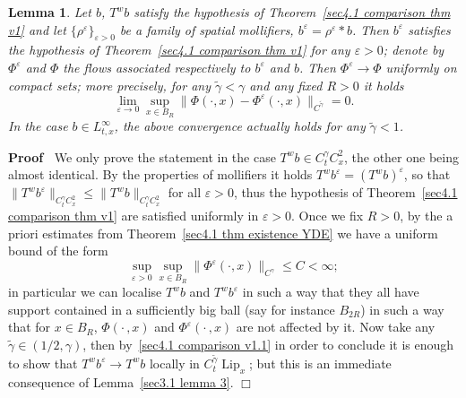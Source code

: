 \documentclass[10pt]{article}
\newcommand{\tmop}[1]{\ensuremath{\operatorname{#1}}}
\newenvironment{proof}{\noindent\textbf{Proof\ }}{\hspace*{\fill}$\Box$\medskip}
\newtheorem{lemma}{Lemma}
\begin{document}
\begin{lemma}
  \label{sec4.3 lemma convergence mollified flows}Let $b$, $T^w b$ satisfy the
  hypothesis of Theorem~\ref{sec4.1 comparison thm v1} and let $\{
  \rho^{\varepsilon} \}_{\varepsilon > 0}$ be a family of spatial mollifiers,
  $b^{\varepsilon} = \rho^{\varepsilon} \ast b$. Then $b^{\varepsilon}$
  satisfies the hypothesis of Theorem~\ref{sec4.1 comparison thm v1} for any
  $\varepsilon > 0$; denote by $\Phi^{\varepsilon}$ and $\Phi$ the flows
  associated respectively to $b^{\varepsilon}$ and $b$. Then
  $\Phi^{\varepsilon} \rightarrow \Phi$ uniformly on compact sets; more
  precisely, for any $\tilde{\gamma} < \gamma$ and any fixed $R > 0$ it holds
  \begin{equation}
    \lim_{\varepsilon \rightarrow 0} \sup_{x \in B_R} \| \Phi (\cdot, x) -
    \Phi^{\varepsilon} (\cdot, x) \|_{C^{\tilde{\gamma}}} = 0. \label{sec4.3
    lemma convergence mollified flow}
  \end{equation}
  In the case $b \in L^{\infty}_{t, x}$, the above convergence actually holds
  for any $\tilde{\gamma} < 1$.
\end{lemma}

\begin{proof}
  We only prove the statement in the case $T^w b \in C^{\gamma}_t C^2_x$, the
  other one being almost identical. By the properties of mollifiers it holds
  $T^w b^{\varepsilon} = (T^w b)^{\varepsilon}$, so that $\| T^w
  b^{\varepsilon} \|_{C^{\gamma}_t C^2_x} \leqslant \| T^w b \|_{C^{\gamma}_t
  C^2_x}$ for all $\varepsilon > 0$, thus the hypothesis of
  Theorem~\ref{sec4.1 comparison thm v1} are satisfied uniformly in
  $\varepsilon > 0$. Once we fix $R > 0$, by the a priori estimates from
  Theorem~\ref{sec4.1 thm existence YDE} we have a uniform bound of the form
  \[ \sup_{\varepsilon > 0} \sup_{x \in B_R} \| \Phi^{\varepsilon} (\cdot, x)
     \|_{C^{\gamma}} \leqslant C < \infty ; \]
  in particular we can localise $T^w b$ and $T^w b^{\varepsilon}$ in such a
  way that they all have support contained in a sufficiently big ball (say for
  instance $B_{2 R}$) in such a way that for $x \in B_R$, $\Phi \left( \cdot
  \,, x \right)$ and $\Phi^{\varepsilon} \left( \cdot \,, x \right)$ are not
  affected by it. Now take any $\tilde{\gamma} \in (1 / 2, \gamma)$, then
  by~{\eqref{sec4.1 comparison v1.1}} in order to conclude it is enough to
  show that $T^w b^{\varepsilon} \rightarrow T^w b$ locally in
  $C^{\tilde{\gamma}}_t \tmop{Lip}_x$; but this is an immediate consequence of
  Lemma~\ref{sec3.1 lemma 3}.
\end{proof}
\end{document}
